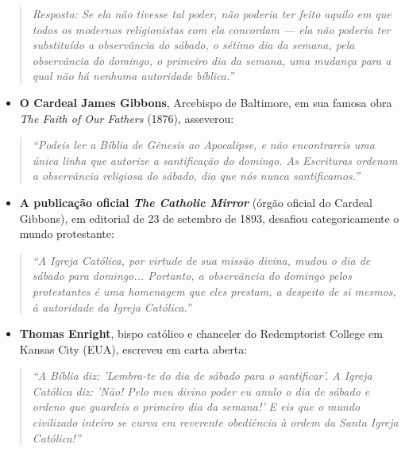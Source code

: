 \begin{quote}
\itshape \textit{Resposta: Se ela não tivesse tal poder, não poderia ter feito aquilo em que todos os modernos religionistas com ela concordam — ela não poderia ter substituído a observância do sábado, o sétimo dia da semana, pela observância do domingo, o primeiro dia da semana, uma mudança para a qual não há nenhuma autoridade bíblica.''}
\end{quote}

\begin{itemize}
  \item \textbf{O Cardeal James Gibbons}, Arcebispo de Baltimore, em sua famosa obra \textit{The Faith of Our Fathers} (1876), asseverou:
\end{itemize}


\begin{quote}
\itshape \textit{``Podeis ler a Bíblia de Gênesis ao Apocalipse, e não encontrareis uma única linha que autorize a santificação do domingo. As Escrituras ordenam a observância religiosa do sábado, dia que nós nunca santificamos.''}
\end{quote}

\begin{itemize}
  \item \textbf{A publicação oficial \textit{The Catholic Mirror}} (órgão oficial do Cardeal Gibbons), em editorial de 23 de setembro de 1893, desafiou categoricamente o mundo protestante:
\end{itemize}


\begin{quote}
\itshape \textit{``A Igreja Católica, por virtude de sua missão divina, mudou o dia de sábado para domingo... Portanto, a observância do domingo pelos protestantes é uma homenagem que eles prestam, a despeito de si mesmos, à autoridade da Igreja Católica.''}
\end{quote}

\begin{itemize}
  \item \textbf{Thomas Enright}, bispo católico e chanceler do Redemptorist College em Kansas City (EUA), escreveu em carta aberta:
\end{itemize}


\begin{quote}
\itshape \textit{``A Bíblia diz: 'Lembra-te do dia de sábado para o santificar'. A Igreja Católica diz: 'Não! Pelo meu divino poder eu anulo o dia de sábado e ordeno que guardeis o primeiro dia da semana!' E eis que o mundo civilizado inteiro se curva em reverente obediência à ordem da Santa Igreja Católica!''}
\end{quote}


